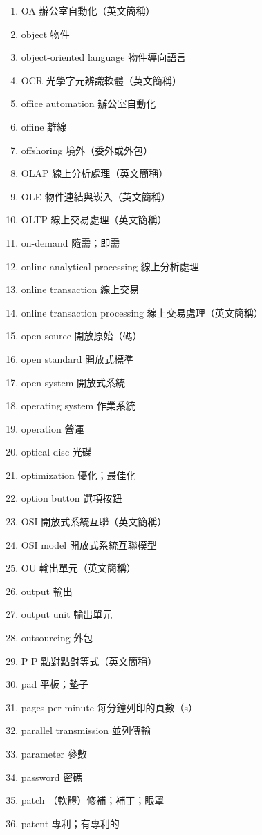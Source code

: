 \begin{enumerate}
  \item OA 辦公室自動化（英文簡稱）
  \item object 物件
  \item object-oriented language 物件導向語言
  \item OCR 光學字元辨識軟體（英文簡稱）
  \item office automation 辦公室自動化
  \item offine 離線
  \item offshoring 境外（委外或外包）
  \item OLAP 線上分析處理（英文簡稱）
  \item OLE 物件連結與崁入（英文簡稱）
  \item OLTP 線上交易處理（英文簡稱）
  \item on-demand 隨需；即需
  \item online analytical processing 線上分析處理
  \item online transaction 線上交易
  \item online transaction processing 線上交易處理（英文簡稱）
  \item open source 開放原始（碼）
  \item open standard 開放式標準
  \item open system 開放式系統
  \item operating system 作業系統
  \item operation 營運
  \item optical disc 光碟
  \item optimization 優化；最佳化
  \item option button 選項按鈕
  \item OSI 開放式系統互聯（英文簡稱）
  \item OSI model 開放式系統互聯模型
  \item OU 輸出單元（英文簡稱）
  \item output 輸出
  \item output unit 輸出單元
  \item outsourcing 外包
  \item P P 點對點對等式（英文簡稱）
  \item pad 平板；墊子
  \item pages per minute 每分鐘列印的頁數（s）
  \item parallel transmission 並列傳輸
  \item parameter 參數
  \item password 密碼
  \item patch （軟體）修補；補丁；眼罩
  \item patent 專利；有專利的

\end{enumerate}
